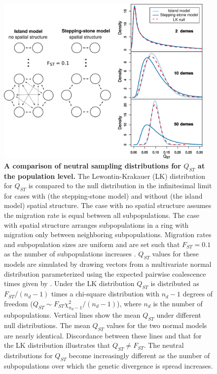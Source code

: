 \begin{figure}
  \centering
  \includegraphics[width=0.95\textwidth]{./figures/pop_struct_combine_alt.pdf}
  \caption{ \textbf{A comparison of neutral sampling distributions for $Q_{ST}$
      at the population level.} The Lewontin-Krakauer (LK) distribution for
    $Q_{ST}$ is compared to the null distribution in the infinitesimal limit for
    cases with (the stepping-stone model) and without (the island model) spatial
    structure. The case with no spatial structure assumes the migration rate is
    equal between all subpopulations. The case with spatial structure arranges
    subpopulations in a ring with migration only between neighboring
    subpopulations. Migration rates and subpopulation sizes are uniform and are
    set such that $F_{ST}=0.1$ as the number of subpopulations increases
    \citep{Slatkin1991}. $Q_{ST}$ values for these models are simulated by
    drawing vectors from a multivariate normal distribution parameterized using
    the expected pairwise coalescence times given by \citep{Slatkin1991}. Under
    the LK distribution $Q_{ST}$ is distributed as $F_{ST}/(n_d - 1)$ times a
    chi-square distribution with $n_d - 1$ degrees of freedom ($Q_{ST}\sim
    F_{ST}\chi^2_{n_d - 1}/(n_d-1)$), where $n_d$ is the number of
    subpopulations. Vertical lines show the mean $Q_{ST}$ under different null
    distributions. The mean $Q_{ST}$ values for the two normal models are nearly
    identical. Discordance between these lines and that for the LK distribution
    illustrates that $Q_{ST} \neq F_{ST}$. The neutral distributions for
    $Q_{ST}$ become increasingly different as the number of subpopulations over
    which the genetic divergence is spread increases.}
  \label{fig:qst_deme}
\end{figure}

